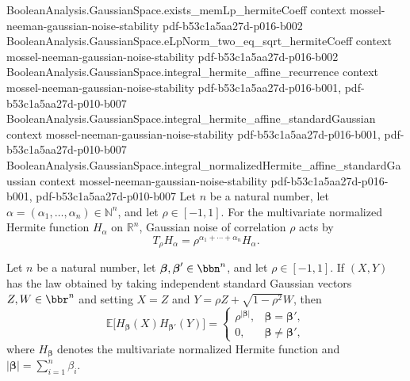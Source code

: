 \begin{theorem}
  {BooleanAnalysis.GaussianSpace.exists_memLp_hermiteCoeff}
  {context}
  {mossel-neeman-gaussian-noise-stability}
  {pdf-b53c1a5aa27d-p016-b002}
\proofstep
  {BooleanAnalysis.GaussianSpace.eLpNorm_two_eq_sqrt_hermiteCoeff}
  {context}
  {mossel-neeman-gaussian-noise-stability}
  {pdf-b53c1a5aa27d-p016-b002}
\proofstep
  {BooleanAnalysis.GaussianSpace.integral_hermite_affine_recurrence}
  {context}
  {mossel-neeman-gaussian-noise-stability}
  {pdf-b53c1a5aa27d-p016-b001,
    pdf-b53c1a5aa27d-p010-b007}
\proofstep
  {BooleanAnalysis.GaussianSpace.integral_hermite_affine_standardGaussian}
  {context}
  {mossel-neeman-gaussian-noise-stability}
  {pdf-b53c1a5aa27d-p016-b001,
    pdf-b53c1a5aa27d-p010-b007}
\proofstep
  {BooleanAnalysis.GaussianSpace.integral_normalizedHermite_affine_standardGaussian}
  {context}
  {mossel-neeman-gaussian-noise-stability}
  {pdf-b53c1a5aa27d-p016-b001,
    pdf-b53c1a5aa27d-p010-b007}
Let $n$ be a natural number, let $\alpha=(\alpha_1,\ldots,\alpha_n)\in\mathbb N^n$, and
let $\rho\in[-1,1]$. For the multivariate normalized Hermite function $H_\alpha$ on
$\mathbb R^n$, Gaussian noise of correlation $\rho$ acts by
\[T_\rho H_\alpha=\rho^{\alpha_1+\cdots+\alpha_n}H_\alpha.\]
\end{theorem}

\begin{theorem}
\label{BooleanAnalysis.GaussianSpace.hermite_correlated_moment}
\leanok
{}
Let $n$ be a natural number, let $\boldsymbol{\beta},\boldsymbol{\beta}'\in\bbn^n$, and let
$\rho\in[-1,1]$. If $(X,Y)$ has the law obtained by taking independent standard Gaussian
vectors $Z,W\in\bbr^n$ and setting $X=Z$ and $Y=\rho Z+\sqrt{1-\rho^2}W$, then
\[
\mathbb{E}\bigl[H_{\boldsymbol{\beta}}(X)H_{\boldsymbol{\beta}'}(Y)\bigr]=
\begin{cases}
\rho^{|\boldsymbol{\beta}|},&\boldsymbol{\beta}=\boldsymbol{\beta}',\\
0,&\boldsymbol{\beta}\ne\boldsymbol{\beta}',
\end{cases}
\]
where $H_{\boldsymbol{\beta}}$ denotes the multivariate normalized Hermite function and
$|\boldsymbol{\beta}|=\sum_{i=1}^n\beta_i$.
\end{theorem}

